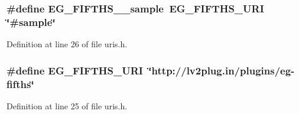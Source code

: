 \subsubsection[{\texorpdfstring{E\+G\+\_\+\+F\+I\+F\+T\+H\+S\+\_\+\+\_\+sample}{EG_FIFTHS__sample}}]{\setlength{\rightskip}{0pt plus 5cm}\#define E\+G\+\_\+\+F\+I\+F\+T\+H\+S\+\_\+\+\_\+sample~{\bf E\+G\+\_\+\+F\+I\+F\+T\+H\+S\+\_\+\+U\+RI} \char`\"{}\#sample\char`\"{}}\hypertarget{eg-fifths_8lv2_2uris_8h_ac1715b61603f1eda13fb0d611f92edcb}{}\label{eg-fifths_8lv2_2uris_8h_ac1715b61603f1eda13fb0d611f92edcb}


Definition at line 26 of file uris.\+h.

\subsubsection[{\texorpdfstring{E\+G\+\_\+\+F\+I\+F\+T\+H\+S\+\_\+\+U\+RI}{EG_FIFTHS_URI}}]{\setlength{\rightskip}{0pt plus 5cm}\#define E\+G\+\_\+\+F\+I\+F\+T\+H\+S\+\_\+\+U\+RI~\char`\"{}http\+://{\bf lv2plug.\+in}/plugins/eg-\/fifths\char`\"{}}\hypertarget{eg-fifths_8lv2_2uris_8h_aaeef56d8066b6533451df6c119009e7d}{}\label{eg-fifths_8lv2_2uris_8h_aaeef56d8066b6533451df6c119009e7d}


Definition at line 25 of file uris.\+h.

